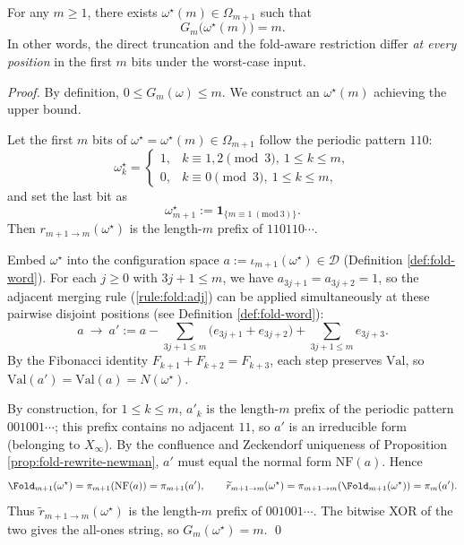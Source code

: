 \begin{theorem}\label{thm:fold-gauge-anomaly-max}
For any \(m\ge 1\), there exists \(\omega^\star(m)\in\Omega_{m+1}\) such that
$$
G_m\bigl(\omega^\star(m)\bigr)=m.
$$
In other words, the direct truncation and the fold-aware restriction differ \emph{at every position} in the first \(m\) bits under the worst-case input.
\end{theorem}

\begin{proof}
By definition, \(0\le G_m(\omega)\le m\).
We construct an \(\omega^\star(m)\) achieving the upper bound.
\par
Let the first \(m\) bits of \(\omega^\star=\omega^\star(m)\in\Omega_{m+1}\) follow the periodic pattern \(110\):
$$
\omega^\star_k=
\begin{cases}
1,& k\equiv 1,2\pmod 3,\ 1\le k\le m,\\
0,& k\equiv 0\pmod 3,\ 1\le k\le m,
\end{cases}
$$
and set the last bit as
$$
\omega^\star_{m+1}:=\mathbf{1}_{\{m\equiv 1\ (\mathrm{mod}\ 3)\}}.
$$
Then \(r_{m+1\to m}(\omega^\star)\) is the length-\(m\) prefix of \(110110\cdots\).
\par
Embed \(\omega^\star\) into the configuration space \(a:=\iota_{m+1}(\omega^\star)\in\mathcal D\) (Definition \ref{def:fold-word}).
For each \(j\ge 0\) with \(3j+1\le m\), we have \(a_{3j+1}=a_{3j+2}=1\), so the adjacent merging rule (\ref{rule:fold:adj}) can be applied simultaneously at these pairwise disjoint positions (see Definition \ref{def:fold-word}):
$$
a\ \to\ a':=a-\sum_{3j+1\le m}\bigl(e_{3j+1}+e_{3j+2}\bigr)+\sum_{3j+1\le m}e_{3j+3}.
$$
By the Fibonacci identity \(F_{k+1}+F_{k+2}=F_{k+3}\), each step preserves \(\mathrm{Val}\), so \(\mathrm{Val}(a')=\mathrm{Val}(a)=N(\omega^\star)\).
\par
By construction, for \(1\le k\le m\), \(a'_k\) is the length-\(m\) prefix of the periodic pattern \(001001\cdots\); this prefix contains no adjacent \(11\), so \(a'\) is an irreducible form (belonging to \(X_\infty\)).
By the confluence and Zeckendorf uniqueness of Proposition \ref{prop:fold-rewrite-newman}, \(a'\) must equal the normal form \(\mathrm{NF}(a)\).
Hence
$$
\Fold_{m+1}(\omega^\star)=\pi_{m+1}(\mathrm{NF}(a))=\pi_{m+1}(a'),
\qquad
\widetilde r_{m+1\to m}(\omega^\star)=\pi_{m+1\to m}(\Fold_{m+1}(\omega^\star))=\pi_m(a').
$$
Thus \(\widetilde r_{m+1\to m}(\omega^\star)\) is the length-\(m\) prefix of \(001001\cdots\).
The bitwise XOR of the two gives the all-ones string, so \(G_m(\omega^\star)=m\). \qed
\end{proof}

